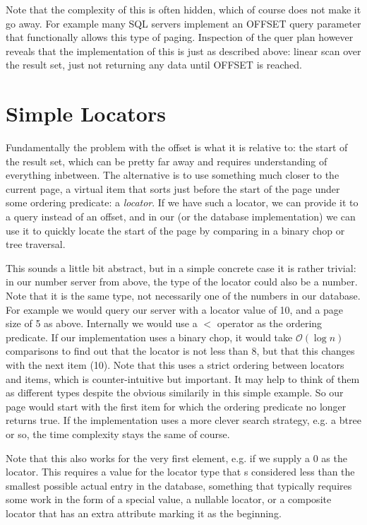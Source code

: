 \documentclass[11pt,a4paper]{article}
\begin{document}
\begin{multicols}{2}
Note that the complexity of this is often hidden, which of course does not make
it go away. For example many SQL servers implement an OFFSET query parameter
that functionally allows this type of paging. Inspection of the quer plan
however reveals that the implementation of this is just as described above:
linear scan over the result set, just not returning any data until OFFSET is
reached.

\section*{Simple Locators}

Fundamentally the problem with the offset is what it is relative to: the start
of the result set, which can be pretty far away and requires understanding of
everything inbetween. The alternative is to use something much closer to the
current page, a virtual item that sorts just before the start of the page under
some ordering predicate: a {\em locator}. If we have such a locator, we can provide it
to a query instead of an offset, and in our (or the database implementation) we
can use it to quickly locate the start of the page by comparing in a binary chop
or tree traversal.

This sounds a little bit abstract, but in a simple concrete case it is rather
trivial: in our number server from above, the type of the locator could also be
a number. Note that it is the same type, not necessarily one of the numbers in
our database. For example we would query our server with a locator value of 10,
and a page size of 5 as above. Internally we would use a $<$ operator as the
ordering predicate. If our implementation uses a binary chop, it would take
$\mathcal{O}(\log{}n)$ comparisons to find out that the locator is not less
than 8, but that this changes with the next item (10). Note that this uses a
strict ordering between locators and items, which is counter-intuitive but
important. It may help to think of them as different types despite the obvious
similarily in this simple example. So our page would start with the first item
for which the ordering predicate no longer returns true. If the implementation
uses a more clever search strategy, e.g. a btree or so, the time complexity
stays the same of course.

Note that this also works for the very first element, e.g. if we supply a 0 as
the locator. This requires a value for the locator type that s considered less
than the smallest possible actual entry in the database, something that
typically requires some work in the form of a special value, a nullable locator,
or a composite locator that has an extra attribute marking it as the beginning.


\end{multicols}
\end{document}

